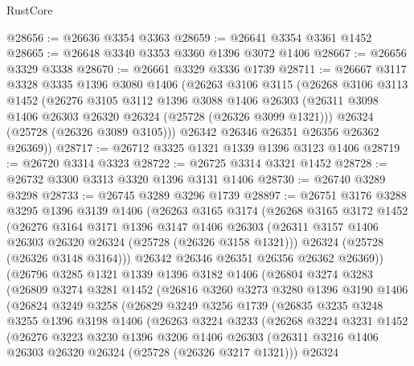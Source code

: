 \begin{lexlean}{RustCore}
\begin{coremodule}
@28656 := @26636 @3354 @3363
@28659 := @26641 @3354 @3361 @1452
@28665 := @26648 @3340 @3353 @3360 @1396 @3072 @1406
@28667 := @26656 @3329 @3338
@28670 := @26661 @3329 @3336 @1739
@28711 := @26667
    @3117
    @3328
    @3335
    @1396
    @3080
    @1406
    (@26263
      @3106
      @3115
      (@26268
        @3106
        @3113
        @1452
        (@26276
          @3105
          @3112
          @1396
          @3088
          @1406
          @26303
          (@26311 @3098 @1406 @26303 @26320 @26324 (@25728 (@26326 @3099 @1321)))
          @26324
          (@25728 (@26326 @3089 @3105)))
        @26342
        @26346
        @26351
        @26356
        @26362
        @26369))
@28717 := @26712 @3325 @1321 @1339 @1396 @3123 @1406
@28719 := @26720 @3314 @3323
@28722 := @26725 @3314 @3321 @1452
@28728 := @26732 @3300 @3313 @3320 @1396 @3131 @1406
@28730 := @26740 @3289 @3298
@28733 := @26745 @3289 @3296 @1739
@28897 := @26751
    @3176
    @3288
    @3295
    @1396
    @3139
    @1406
    (@26263
      @3165
      @3174
      (@26268
        @3165
        @3172
        @1452
        (@26276
          @3164
          @3171
          @1396
          @3147
          @1406
          @26303
          (@26311 @3157 @1406 @26303 @26320 @26324 (@25728 (@26326 @3158 @1321)))
          @26324
          (@25728 (@26326 @3148 @3164)))
        @26342
        @26346
        @26351
        @26356
        @26362
        @26369))
    (@26796
      @3285
      @1321
      @1339
      @1396
      @3182
      @1406
      (@26804
        @3274
        @3283
        (@26809
          @3274
          @3281
          @1452
          (@26816
            @3260
            @3273
            @3280
            @1396
            @3190
            @1406
            (@26824
              @3249
              @3258
              (@26829
                @3249
                @3256
                @1739
                (@26835
                  @3235
                  @3248
                  @3255
                  @1396
                  @3198
                  @1406
                  (@26263
                    @3224
                    @3233
                    (@26268
                      @3224
                      @3231
                      @1452
                      (@26276
                        @3223
                        @3230
                        @1396
                        @3206
                        @1406
                        @26303
                        (@26311 @3216 @1406 @26303 @26320 @26324 (@25728 (@26326 @3217 @1321)))
                        @26324

\end{coremodule}
\end{lexlean}
